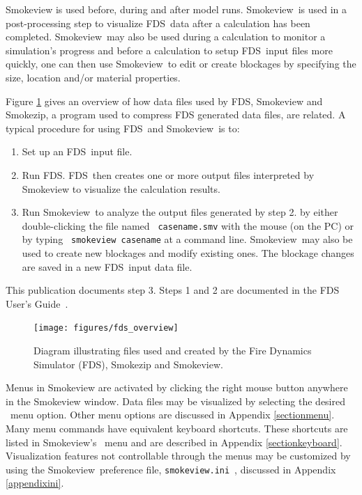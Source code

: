 \documentclass[11pt,twoside]{book}
\newcommand{\svini}{{\tt smokeview.ini}\ }
\newcommand{\figoptions}{hbp}
\newcommand{\fds}{{FDS}}
\newcommand{\Smokeview}{{Smokeview}}
\newcommand{\smokeview}{{Smokeview}}
\newcommand{\loadmenu}{\fbox{\tt Load/Unload} }
\newcommand{\helpmenu}{\fbox{\tt Help} }
\begin{document}
Smokeview is used before, during and after model runs.
\smokeview\ is used in a post-processing step to
visualize \fds\ data after a calculation has been completed.
\Smokeview\  may also be used during a calculation to monitor a
simulation's progress and before a calculation to setup \fds\
input files more quickly, one can then use \smokeview\ to edit or
create blockages by specifying the size, location and/or material
properties.

Figure \ref{figfdsoverview} gives an overview of how data files
used by FDS,  Smokeview and Smokezip, a program used to compress FDS generated data files, are related. A typical
procedure for using \fds\ and \smokeview\ is to:
\begin{enumerate}

\item Set up an \fds\ input file.

\item Run \fds.  \fds\ then creates one or more output files interpreted
by Smokeview to visualize the calculation results.

\item Run \smokeview\ to analyze the output files generated by
step 2. by either double-clicking the file named {\tt
casename.smv} with the mouse (on the PC) or by typing {\tt
smokeview casename} at a command line. \Smokeview\ may also be
used to create new blockages and modify existing ones. The
blockage changes are saved in a new \fds\ input data file.
\end{enumerate}

\noindent This publication documents step 3. Steps 1 and 2 are documented in
the FDS User's Guide~\cite{FDS_Users_Guide_5}.

\begin{figure}[\figoptions]
\centerline{
\texttt{[image: figures/fds\_overview]}}
 \caption[FDS file overview]{Diagram illustrating files used and created by the Fire Dynamics
 Simulator (FDS), Smokezip and Smokeview.}
\label{figfdsoverview}%
\end{figure}

Menus in Smokeview are activated by clicking the right mouse
button anywhere in the Smokeview window.  Data files may be
visualized by selecting the desired \loadmenu\ menu option. Other
menu options are discussed in Appendix \ref{sectionmenu}. Many
menu commands have equivalent keyboard shortcuts. These shortcuts
are listed in \smokeview's \helpmenu\ menu and are described in
Appendix \ref{sectionkeyboard}. Visualization features not
controllable through the menus may be customized by using the
\smokeview\ preference file, \svini, discussed in
Appendix \ref{appendixini}.
\end{document}
